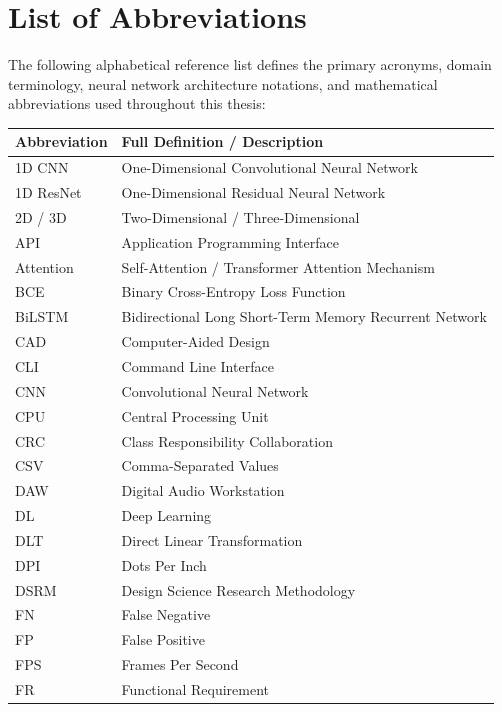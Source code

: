 \chapter*{List of Abbreviations}

\noindent
The following alphabetical reference list defines the primary acronyms, domain terminology, neural network architecture notations, and mathematical abbreviations used throughout this thesis:

\vspace{0.4cm}

{\small
\renewcommand{\arraystretch}{1.12}
\begin{longtable}{l p{13.5cm}}
\toprule
\textbf{Abbreviation} & \textbf{Full Definition / Description} \\
\midrule
1D CNN & One-Dimensional Convolutional Neural Network \\
1D ResNet & One-Dimensional Residual Neural Network \\
2D / 3D & Two-Dimensional / Three-Dimensional \\
API & Application Programming Interface \\
Attention & Self-Attention / Transformer Attention Mechanism \\
BCE & Binary Cross-Entropy Loss Function \\
BiLSTM & Bidirectional Long Short-Term Memory Recurrent Network \\
CAD & Computer-Aided Design \\
CLI & Command Line Interface \\
CNN & Convolutional Neural Network \\
CPU & Central Processing Unit \\
CRC & Class Responsibility Collaboration \\
CSV & Comma-Separated Values \\
DAW & Digital Audio Workstation \\
DL & Deep Learning \\
DLT & Direct Linear Transformation \\
DPI & Dots Per Inch \\
DSRM & Design Science Research Methodology \\
FN & False Negative \\
FP & False Positive \\
FPS & Frames Per Second \\
FR & Functional Requirement \\

\end{longtable}}
